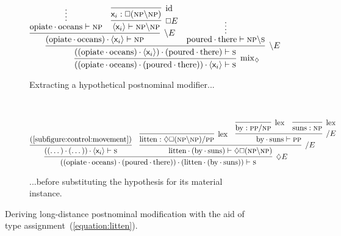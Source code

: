 \begin{figure}
	\centering
	\begin{subfigure}{1\textwidth}
		\smaller
		\[
			\infer[\rulestyle{mix}_{\diamond}]{((\w{opiate}\sbind\w{oceans})\sbind(\w{poured}\sbind\w{there}))\sbind\bracket{\term{\vari }} \vdash \s}{
				\infer[\divleft E]{((\w{opiate}\sbind\w{oceans})\sbind\bracket{\term{\vari }})\sbind(\w{poured}\sbind\w{there}) \vdash \s}{
					\infer[\divleft E]{(\w{opiate}\sbind\w{oceans})\sbind\bracket{\term{\vari }} \vdash \np}{
						\infer*{\w{opiate}\sbind\w{oceans} \vdash \np}{}
						&
						\infer[\bx E]{\bracket{\term{\vari }} \vdash \np\divleft\np}{
							\infer[\Ax]{\term{\vari }: \bx (\np\divleft\np)}{}
						}
					}
					&
					\infer*{\w{poured}\sbind\w{there} \vdash \np\divleft\s}{}
				}
			}
		\]
		\caption{Extracting a hypothetical postnominal modifier...}
		\label{subfigure:control:movement}
	\end{subfigure}\\[\midsep]
	\begin{subfigure}{1\textwidth}
	\centering
		\smaller
		\[
			\infer[\diamond E]{((\w{opiate}\sbind\w{oceans})\sbind(\w{poured}\sbind\w{there}))\sbind(\w{litten}\sbind(\w{by}\sbind\w{suns})) \vdash \s}{
				\infer{((\dots)\sbind(\dots))\sbind\bracket{\term{\vari }} \vdash \s}{\text{(\ref{subfigure:control:movement})}}
				&
				\infer[\divright E]{\w{litten}\sbind(\w{by}\sbind\w{suns}) \vdash \diamond\bx(\np\divleft\np)}{
					\infer[\Lex]{\w{litten} : \diamond\bx(\np\divleft\np)\divright\pp }{}
					&
					\infer[\divright E]{\w{by}\sbind\w{suns} \vdash \pp}{
						\infer[\Lex]{\w{by}: \pp\divright\np}{}
						&
						\infer[\Lex]{\w{suns}: \np}{}
					}
				}
			}
		\]
		\caption{...before substituting the hypothesis for its material instance.}
		\label{subfigure:control:substitution}
	\end{subfigure}
	\caption{Deriving long-distance postnominal modification with the aid of type assignment~(\ref{equation:litten}).}
	\label{figure:lovecraft_postnominal}
\end{figure}



